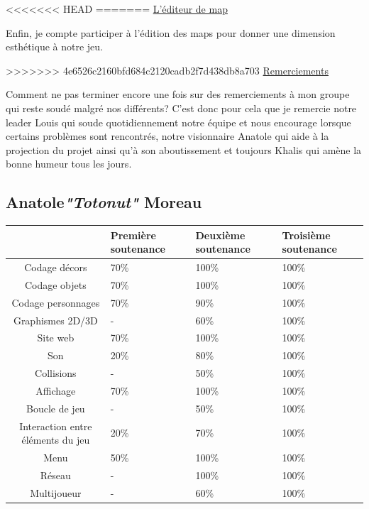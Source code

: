 \documentclass{article}
\begin{document}
\par
<<<<<<< HEAD
=======
\underline{L'éditeur de map}
\newline
\par
Enfin, je compte participer à l'édition des maps pour donner une dimension esthétique à notre jeu.
\newline

\par
>>>>>>> 4e6526c2160bfd684c2120cadb2f7d438db8a703
\underline{Remerciements}
\newline
\par
Comment ne pas terminer encore une fois sur des remerciements à mon groupe qui reste soudé malgré nos différents? C'est donc pour cela que je remercie notre leader Louis qui soude quotidiennement notre équipe et nous encourage lorsque certains problèmes sont rencontrés, notre visionnaire Anatole qui aide à la projection du projet ainsi qu'à son aboutissement et toujours Khalis qui amène la bonne humeur tous les jours.

\newpage

\subsection {Anatole\textcolor {pseudoblue} {\textit {"Totonut"}} Moreau}
\newpage
\begin{tabular}{|c|p{2cm}|p{2cm}|p{2cm}|}


\hline
& Première soutenance & Deuxième soutenance & Troisième soutenance\\ 
\hline

Codage décors & 70\% & 100\% & 100\%\\
\hline
Codage objets & 70\% & 100\% & 100\%\\
\hline
Codage personnages & 70\% & 90\% & 100\%\\
\hline

Graphismes 2D/3D & - & 60\% & 100\%\\
\hline

Site web & 70\% & 100\% & 100\%\\
\hline

Son & 20\% & 80\% & 100\%\\
\hline

Collisions & - & 50\% & 100\%\\
\hline

Affichage & 70\% & 100\% & 100\%\\
\hline

Boucle de jeu & - & 50\% & 100\%\\
\hline

Interaction entre éléments du jeu & 20\% & 70\% & 100\%\\
\hline

Menu & 50\% & 100\% & 100\%\\
\hline

Réseau & - & 100\% & 100\%\\
\hline

Multijoueur & - & 60\% & 100\%\\
\hline

\end{tabular}
\end{document}
